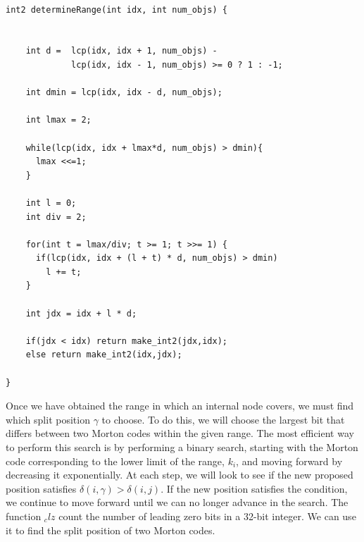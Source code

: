 \documentclass[titlepage,12pt]{report}
\begin{document}
\begin{lstlisting}

int2 determineRange(int idx, int num_objs) {

  
    int d =  lcp(idx, idx + 1, num_objs) - 
             lcp(idx, idx - 1, num_objs) >= 0 ? 1 : -1;
    
    int dmin = lcp(idx, idx - d, num_objs);
    
    int lmax = 2;
    
    while(lcp(idx, idx + lmax*d, num_objs) > dmin){
      lmax <<=1;
    }
    
    int l = 0;
    int div = 2;
    
    for(int t = lmax/div; t >= 1; t >>= 1) {
      if(lcp(idx, idx + (l + t) * d, num_objs) > dmin)
      	l += t;
    }
    
    int jdx = idx + l * d;
        
    if(jdx < idx) return make_int2(jdx,idx);
    else return make_int2(idx,jdx);
    
}
\end{lstlisting}

Once we have obtained the range in which an internal node covers, we must find which split position $\gamma$ to choose. To do this, we will choose the largest bit that differs between two Morton codes within the given range. The most efficient way to perform this search is by performing a binary search, starting with the Morton code corresponding to the lower limit of the range, $k_i$, and moving forward by decreasing it exponentially. At each step, we will look to see if the new proposed position satisfies $\delta(i,\gamma) > \delta(i,j)$. If the new position satisfies the condition, we continue to move forward until we can no longer advance in the search. The function $_clz$ count the number of leading zero bits in a 32-bit integer. We can use it to find the split position of two Morton codes.
\end{document}
